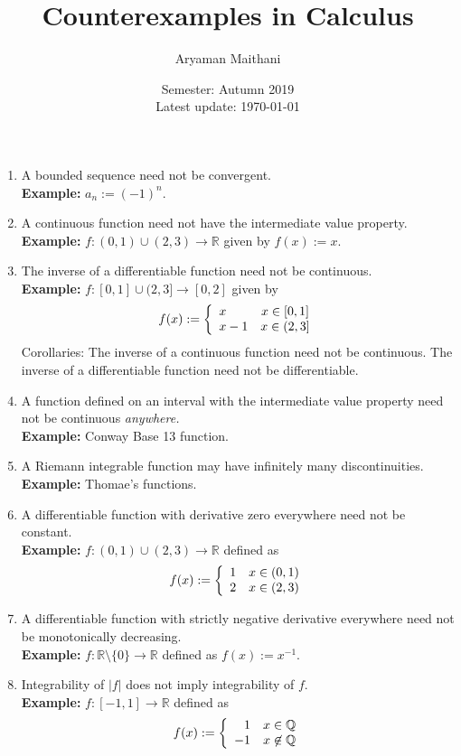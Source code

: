 \documentclass{article}
\title{Counterexamples in Calculus}
\author{Aryaman Maithani}
\date{Semester: Autumn 2019\\ Latest update: \today}
\begin{document}
\maketitle
\hrulefill
\begin{enumerate} 
	\item A bounded sequence need not be convergent.\\
	\textbf{Example:} $a_n := (-1)^n.$
	\item A continuous function need not have the intermediate value property.\\
	\textbf{Example:} $f:(0, 1) \cup (2, 3) \to \mathbb{R}$ given by $f(x) := x.$
	\item The inverse of a differentiable function need not be continuous.\\
	\textbf{Example:} $f:[0, 1] \cup (2, 3] \to [0, 2]$ given by
	\[f(x) := \left\{
	\begin{array}{l c}
		x & x \in [0, 1]\\
		x-1 & x \in (2, 3]		
	\end{array}
	\right.\]
	Corollaries: The inverse of a continuous function need not be continuous. The inverse of a differentiable function need not be differentiable.
	\item A function defined on an interval with the intermediate value property need not be continuous \emph{anywhere.}\\
	\textbf{Example:} Conway Base 13 function.
	\item A Riemann integrable function may have infinitely many discontinuities.\\
	\textbf{Example:} Thomae's functions.
	\item A differentiable function with derivative zero everywhere need not be constant.\\
	\textbf{Example:} $f:(0, 1) \cup (2, 3) \to \mathbb{R}$ defined as
	\[f(x) := \left\{
	\begin{array}{l c}
		1 & x \in (0, 1)\\
		2 & x \in (2, 3)		
	\end{array}
	\right.\]
	\item A differentiable function with strictly negative derivative everywhere need not be monotonically decreasing.\\
	\textbf{Example:} $f:\mathbb{R}\setminus\{0\} \to \mathbb{R}$ defined as $f(x) := x^{-1}.$
	\item Integrability of $|f|$ does not imply integrability of $f.$\\
	\textbf{Example:} $f:[-1, 1] \to \mathbb{R}$ defined as
	\[f(x) := \left\{
	\begin{array}{r c}
		1 & x \in \mathbb{Q}\\
		-1 & x \not\in \mathbb{Q}		
	\end{array}
	\right.\]
\end{enumerate}
\end{document}
